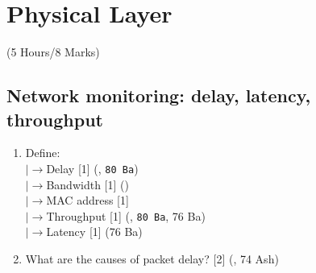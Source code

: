 \documentclass[12pt]{article}
\newcommand{\lb}{\\$\left|\rightarrow\right.$}
\begin{document}
	\pagebreak

\section{Physical Layer}
	\begin{center}(5 Hours/8 Marks)\end{center}
	\subsection{Network monitoring: delay, latency, throughput}
		\begin{enumerate}[noitemsep, topsep=0pt]	
			\item Define:
			\lb Delay \hfill [1] (, \texttt{80 Ba})
			\lb Bandwidth \hfill [1] ()
			\lb MAC address \hfill [1] 
			\lb Throughput \hfill [1] (, \texttt{80 Ba}, 76 Ba)
			\lb Latency \hfill [1] (76 Ba)
			
			\item What are the causes of packet delay? \hfill [2] (, 74 Ash)
		\end{enumerate}
\end{document}
